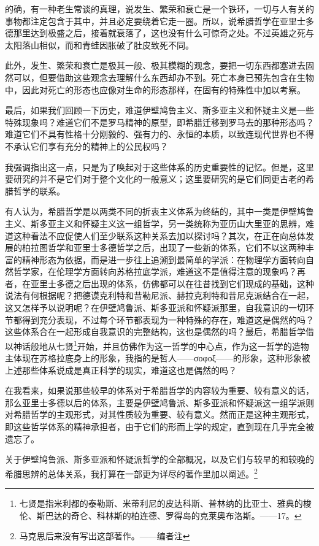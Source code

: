 \documentclass[a4paper,twoside,12pt,AutoFakeBold]{ctexart}
\begin{document}
的确，有一种老生常谈的真理，说发生、繁荣和衰亡是一个铁环，一切与人有关的事物都注定包含于其中，并且必定要绕着它走一圈。所以，说希腊哲学在亚里士多德那里达到极盛之后，接着就衰落了，这也没有什么可惊奇之处。不过英雄之死与太阳落山相似，而和青蛙因胀破了肚皮致死不同。

此外，发生、繁荣和衰亡是极其一般、极其模糊的观念，要把一切东西都塞进去固然可以，但要借助这些观念去理解什么东西却办不到。死亡本身已预先包含在生物中，因此对死亡的形态也应像对生命的形态那样，在固有的特殊性中加以考察。

最后，如果我们回顾一下历史，难道伊壁鸠鲁主义、斯多亚主义和怀疑主义是一些特殊现象吗？难道它们不是罗马精神的原型，即希腊迁移到罗马去的那种形态吗？难道它们不具有性格十分刚毅的、强有力的、永恒的本质，以致连现代世界也不得不承认它们享有充分的精神上的公民权吗？

我强调指出这一点，只是为了唤起对于这些体系的历史重要性的记忆。但是，这里要研究的并不是它们对于整个文化的一般意义；这里要研究的是它们同更古老的希腊哲学的联系。

有人认为，希腊哲学是以两类不同的折衷主义体系为终结的，其中一类是伊壁鸠鲁主义、斯多亚主义和怀疑主义这一组哲学，另一类统称为亚历山大里亚的思辨，难道这种看法不应促使人们至少联系这种关系去加以探讨吗？其次，在正在向总体发展的柏拉图哲学和亚里士多德哲学之后，出现了一些新的体系，它们不以这两种丰富的精神形态为依据，而是进一步往上追溯到最简单的学派：在物理学方面转向自然哲学家，在伦理学方面转向苏格拉底学派，难道这不是值得注意的现象吗？再者，在亚里士多德之后出现的体系，仿佛都可以在往昔找到它们现成的基础，这种说法有何根据呢？把德谟克利特和昔勒尼派、赫拉克利特和昔尼克派结合在一起，这又怎样予以说明呢？在伊壁鸠鲁派、斯多亚派和怀疑派那里，自我意识的一切环节都得到充分表现，不过每个环节都表现为一种特殊的存在，难道这是偶然的吗？这些体系合在一起形成自我意识的完整结构，这也是偶然的吗？最后，希腊哲学借以神话般地从七贤\footnote{七贤是指米利都的泰勒斯、米蒂利尼的皮达科斯、普林纳的比亚士、雅典的梭伦、斯巴达的奇仑、科林斯的柏连德、罗得岛的克莱奥布洛斯。——17。}开始，并且仿佛作为这一哲学的中心点，作为这一哲学的造物主体现在苏格拉底身上的形象，我指的是哲人——σοφοξ——的形象，这种形象被上述那些体系说成是真正科学的现实，难道这也是偶然的吗？

在我看来，如果说那些较早的体系对于希腊哲学的内容较为重要、较有意义的话，那么亚里士多德以后的体系，主要是伊壁鸠鲁派、斯多亚派和怀疑派这一组学派则对希腊哲学的主观形式，对其性质较为重要、较有意义。然而正是这种主观形式，即这些哲学体系的精神承担者，由于它们的形而上学的规定，直到现在几乎完全被遗忘了。

关于伊壁鸠鲁派、斯多亚派和怀疑派哲学的全部概况，以及它们与较早的和较晚的希腊思辨的总体关系，我打算在一部更为详尽的著作里加以阐述。\footnote{马克思后来没有写出这部著作。——编者注}
\end{document}
